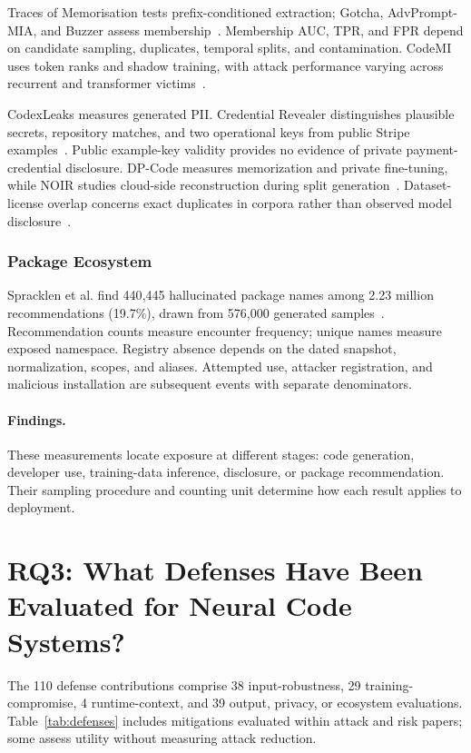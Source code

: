 \documentclass[acmsmall,screen,review,nonacm]{acmart}
\begin{document}
Traces of Memorisation tests prefix-conditioned extraction; Gotcha, AdvPrompt-MIA, and Buzzer assess membership~\cite{alkaswan2024traces,yang2024gotcha,advprompt2025mia,zhang2023buzzer}. Membership AUC, TPR, and FPR depend on candidate sampling, duplicates, temporal splits, and contamination. CodeMI uses token ranks and shadow training, with attack performance varying across recurrent and transformer victims~\cite{codemi2024}.

CodexLeaks measures generated PII. Credential Revealer distinguishes plausible secrets, repository matches, and two operational keys from public Stripe examples~\cite{niu2023codexleaks,huang2024secret}. Public example-key validity provides no evidence of private payment-credential disclosure. DP-Code measures memorization and private fine-tuning, while NOIR studies cloud-side reconstruction during split generation~\cite{dpcode2025,noir2026}. Dataset-license overlap concerns exact duplicates in corpora rather than observed model disclosure~\cite{katzy2024license}.

\subsubsection{Package Ecosystem}
Spracklen et al. find 440{,}445 hallucinated package names among 2.23 million recommendations (19.7\%), drawn from 576{,}000 generated samples~\cite{spracklen2025package}. Recommendation counts measure encounter frequency; unique names measure exposed namespace. Registry absence depends on the dated snapshot, normalization, scopes, and aliases. Attempted use, attacker registration, and malicious installation are subsequent events with separate denominators.

\paragraph{Findings.} \label{sec:gensec:discussion}
These measurements locate exposure at different stages: code generation, developer use, training-data inference, disclosure, or package recommendation. Their sampling procedure and counting unit determine how each result applies to deployment.

\section{RQ3: What Defenses Have Been Evaluated for Neural Code Systems?}
\label{sec:rq3}
\label{sec:defense}

The 110 defense contributions comprise 38 input-robustness, 29 training-compromise, 4 runtime-context, and 39 output, privacy, or ecosystem evaluations. Table~\ref{tab:defenses} includes mitigations evaluated within attack and risk papers; some assess utility without measuring attack reduction.
\end{document}
